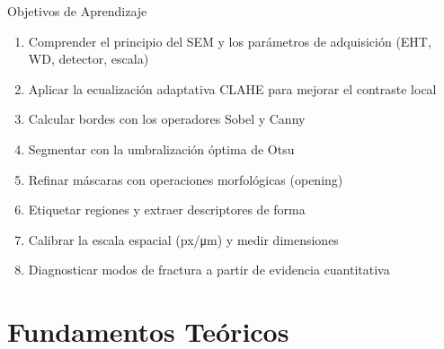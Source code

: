 \documentclass[aspectratio=169,12pt]{beamer}
\begin{document}
\begin{frame}{Objetivos de Aprendizaje}
	\begin{enumerate}
		\item Comprender el principio del SEM y los parámetros de
		      adquisición (EHT, WD, detector, escala)
		\item Aplicar la ecualización adaptativa CLAHE para mejorar
		      el contraste local
		\item Calcular bordes con los operadores Sobel y Canny
		\item Segmentar con la umbralización óptima de Otsu
		\item Refinar máscaras con operaciones morfológicas (opening)
		\item Etiquetar regiones y extraer descriptores de forma
		\item Calibrar la escala espacial (\si{px}/\si{\micro\m})
		      y medir dimensiones
		\item Diagnosticar modos de fractura a partir de evidencia
		      cuantitativa
	\end{enumerate}
\end{frame}

\section{Fundamentos Teóricos}
\end{document}
